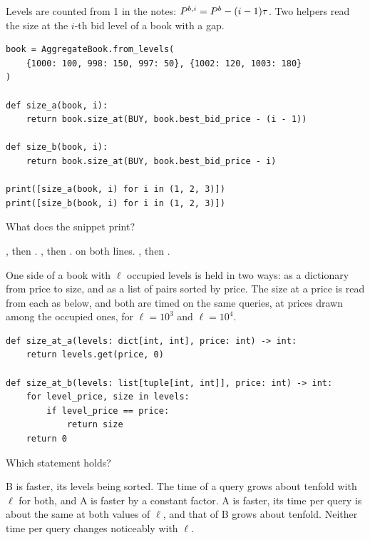 \begin{question}
\label{question.levelsAreOneIndexed}
Levels are counted from 1 in the notes:
$\nthBestBidPrice[i] = \bestBidPrice - (i-1)\tickSizeOfLOB$.
Two helpers read the size at the $i$-th bid level of a book with a gap.
\begin{lstlisting}[caption={Two readings of the $i$-th bid level}, label=listing.levelsOneIndexed]
book = AggregateBook.from_levels(
    {1000: 100, 998: 150, 997: 50}, {1002: 120, 1003: 180}
)

def size_a(book, i):
    return book.size_at(BUY, book.best_bid_price - (i - 1))

def size_b(book, i):
    return book.size_at(BUY, book.best_bid_price - i)

print([size_a(book, i) for i in (1, 2, 3)])
print([size_b(book, i) for i in (1, 2, 3)])
\end{lstlisting}
What does the snippet print?
\begin{choices}
 \correctchoice \codehl{[100, 0, 150]}, then \codehl{[0, 150, 50]}.
 \choice \codehl{[100, 150, 50]}, then \codehl{[150, 50, 0]}.
 \choice \codehl{[100, 0, 150]} on both lines.
 \choice \codehl{[0, 150, 50]}, then \codehl{[100, 0, 150]}.
\end{choices}
\end{question}

\begin{question}
\label{question.sizeAtOnADictAgainstAList}
One side of a book with $\ell$ occupied levels is held in two ways:
as a dictionary from price to size,
and as a list of pairs  sorted by price.
The size at a price is read from each as below,
and both are timed on the same queries, at prices drawn among the occupied ones,
for $\ell = 10^{3}$ and $\ell = 10^{4}$.
\begin{lstlisting}[caption={Two readings of the size at a price}, label=listing.sizeAtDictList]
def size_at_a(levels: dict[int, int], price: int) -> int:
    return levels.get(price, 0)

def size_at_b(levels: list[tuple[int, int]], price: int) -> int:
    for level_price, size in levels:
        if level_price == price:
            return size
    return 0
\end{lstlisting}
Which statement holds?
\begin{choices}
 \choice B is faster, its levels being sorted.
 \choice The time of a query grows about tenfold with $\ell$ for both,
  and A is faster by a constant factor.
 \correctchoice A is faster,
  its time per query is about the same at both values of $\ell$,
  and that of B grows about tenfold.
 \choice Neither time per query changes noticeably with $\ell$.
\end{choices}
\end{question}
